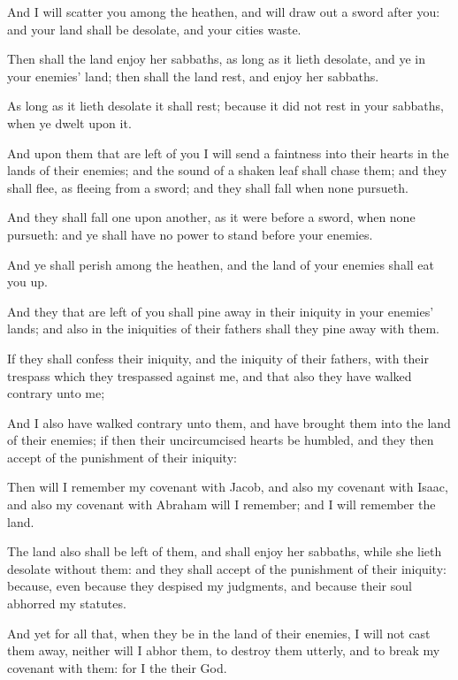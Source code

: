 {And I will
scatter you among the
heathen, and will draw
out a
sword
after you: and your
land shall be
desolate, and your
cities
waste.

Then shall the
land
enjoy her
sabbaths, as
long as it lieth
desolate, and ye
{} in your
enemies’
land;
{} then shall the
land
rest, and
enjoy her
sabbaths.

As long
as it lieth
desolate it shall
rest; because it did not
rest in your
sabbaths, when ye
dwelt upon it.

And upon them that are
left
{} of you I will
send a
faintness into their
hearts in the
lands of their
enemies; and the
sound of a
shaken
leaf shall
chase them; and they shall
flee, as
fleeing from a
sword; and they shall
fall when none
pursueth.

And they shall
fall
one upon
another, as it were
before a
sword, when none
pursueth: and ye shall have no power to
stand
before your
enemies.

And ye shall
perish among the
heathen, and the
land of your
enemies shall eat you
up.

And they that are
left of you shall pine
away in their
iniquity in your
enemies’
lands; and also in the
iniquities of their
fathers shall they pine
away with them.


\par }{\PP {}If they shall
confess their
iniquity, and the
iniquity of their
fathers, with their
trespass which they
trespassed against me, and that also they have
walked
contrary unto me;

And
{} I also have
walked
contrary unto them, and have
brought them into the
land of their
enemies; if
then their
uncircumcised
hearts be
humbled, and they then
accept of the punishment of their
iniquity:

Then will I
remember my
covenant with
Jacob, and also my
covenant with
Isaac, and also my
covenant with
Abraham will I
remember; and I will
remember the
land.

The
land also shall be
left of them, and shall
enjoy her
sabbaths, while she lieth
desolate without them: and they shall
accept of the punishment of their
iniquity:
because, even
because they
despised my
judgments, and because their
soul
abhorred my
statutes.

And
yet for all
that, when they
be in the
land of their
enemies, I will not cast them
away, neither will I
abhor them, to destroy them
utterly, and to
break my
covenant with them: for I
{} the
{} their
God.

}
